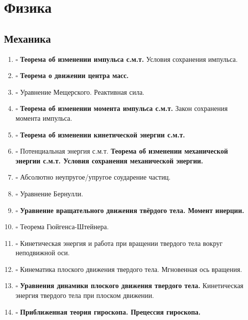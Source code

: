 \section*{Физика}
\begin{multicols}{2}
	\noindent
	\subsection*{Механика}
	\begin{enumerate}[leftmargin=*,itemsep=0cm,parsep=0cm]
		\item $\square$ \textbf{Теорема об изменении импульса с.м.т.} Условия сохранения импульса.
		\item $\square$ \textbf{Теорема о движении центра масс.}
		\item $\square$ Уравнение Мещерского. Реактивная сила.
		\item $\square$ \textbf{Теорема об изменении момента импульса с.м.т.} Закон сохранения момента импульса.
		\item $\square$ \textbf{Теорема об изменении кинетической энергии с.м.т.}
		\item $\square$ Потенциальная энергия с.м.т. \textbf{Теорема об изменении механической энергии с.м.т. Условия сохранения механической энергии.}
		\item $\square$ Абсолютно неупругое/упругое соударение частиц.
		\item $\square$ Уравнение Бернулли.
		\item $\square$ \textbf{Уравнение вращательного движения твёрдого тела. Момент инерции.}
		\item $\square$ Теорема Гюйгенса-Штейнера.
		\item $\square$ Кинетическая энергия и работа при вращении твердого тела вокруг неподвижной оси.
		\item $\square$ Кинематика плоского движения твердого тела. Мгновенная ось вращения.
		\item $\square$ \textbf{Уравнения динамики плоского движения твердого тела.} Кинетическая энергия твердого тела при плоском движении.
		\item $\square$ \textbf{Приближенная теория гироскопа. Прецессия гироскопа.}
	\end{enumerate}

\end{multicols}
